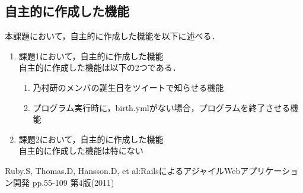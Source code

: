 \documentclass[fleqn, 14pt]{extarticlej}
\begin{document}
\subsection{自主的に作成した機能}
本課題において，自主的に作成した機能を以下に述べる．
\begin{enumerate}
 \item 課題1において，自主的に作成した機能\\
   自主的に作成した機能は以下の2つである．
   \begin{enumerate}
   \item 乃村研のメンバの誕生日をツイートで知らせる機能
   \item プログラム実行時に，birth.ymlがない場合，プログラムを終了させる機能
   \end{enumerate}
 \item 課題2において，自主的に作成した機能\\
   自主的に作成した機能は特にない
\end{enumerate}

\begin{thebibliography}{99}
   Ruby.S, Thomas.D, Hansson.D, et al:RailsによるアジャイルWebアプリケーション開発 pp.55-109 第4版(2011)\\
\end{thebibliography}
\end{document}
